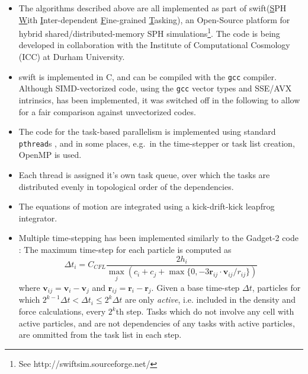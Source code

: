 \documentclass[final]{siamltex}
\newcommand{\swift}
    {{\sc swift}\xspace}
\begin{document}
\begin{itemize}

    \item The algorithms described above are all implemented as part
        of \swift (\underline{S}PH \underline{W}ith
        \underline{I}nter-dependent \underline{F}ine-grained
        \underline{T}asking),
        an Open-Source platform for hybrid shared/distributed-memory
        SPH simulations\footnote{See http://swiftsim.sourceforge.net/}.
        The code is being developed in collaboration with the Institute
        of Computational Cosmology (ICC) at Durham University.

    \item \swift is implemented in C, and can be compiled with the
        {\tt gcc} compiler.
        Although SIMD-vectorized code, using the {\tt gcc} vector types
        and SSE/AVX intrinsics, has been implemented, it was switched
        off in the following to allow for a fair comparison against
        unvectorized codes.

    \item The code for the task-based parallelism is implemented using
        standard {\tt pthread}s \cite{ref:pthreads}, and in some places,
        e.g.~in the time-stepper
        or task list creation, OpenMP \cite{ref:Dagum1998} is used.

    \item Each thread is assigned it's own task queue, over which the tasks
        are distributed evenly in topological order of the dependencies.
        
    \item The equations of motion are integrated using a kick-drift-kick
        leapfrog integrator.
    
    \item Multiple time-stepping has been implemented similarly to
        the Gadget-2 code \cite{ref:Springel2005}: The maximum time-step
        for each particle is computed as
        \begin{equation*}
            \Delta t_i = C_{CFL}\frac{2 h_i}{ \max_j\left( c_i + c_j + \max\{0,-3 \mathbf r_{ij} \cdot \mathbf v_{ij} / r_{ij} \} \right) }
        \end{equation*}
        where $\mathbf v_{ij} = \mathbf v_i - \mathbf v_j$ and
        $\mathbf r_{ij} = \mathbf r_i - \mathbf r_j$.
        Given a base time-step $\Delta t$, particles for which
        $2^{k-1}\Delta t < \Delta t_i \leq 2^k\Delta t$ are only {\em active},
        i.e. included in the density and force calculations, every $2^k$th step.
        Tasks which do not involve any cell with active particles, and
        are not dependencies of any tasks with active particles, are
        ommitted from the task list in each step.
        

\end{itemize}
\end{document}
